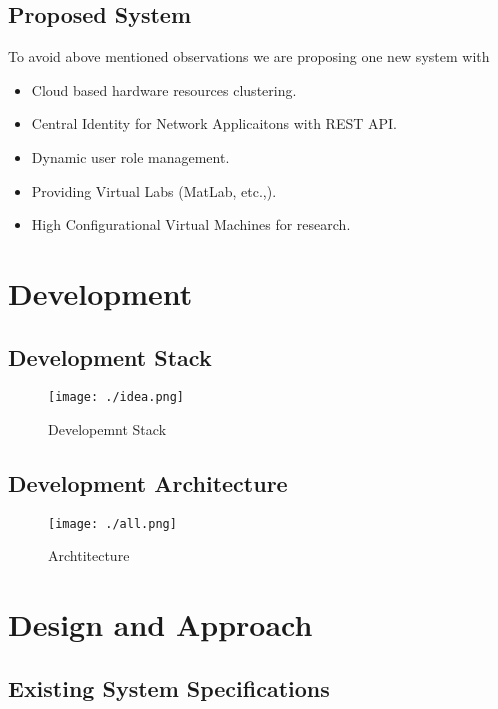 \documentclass[12pt]{report}
\begin{document}
\section{Proposed System}

	To avoid above mentioned observations we are proposing one new system with 
	\begin{itemize}
		\item Cloud based hardware resources clustering.
		\item Central Identity for Network Applicaitons with REST API.
		\item Dynamic user role management.
		\item Providing Virtual Labs (MatLab, etc.,).
		\item High Configurational Virtual Machines for research.
	\end{itemize}

\chapter{Development}

\section{Development Stack}
\begin{figure}[H]
 \centering
 \texttt{[image: ./idea.png]}
 \caption{Developemnt Stack\label{fig:Developemnt Stack}}
\end{figure}

\section{Development Architecture}
\begin{figure}[H]
 \centering
 \texttt{[image: ./all.png]}
 \caption{Archtitecture\label{fig:Archtitecture}}
\end{figure}

\chapter{Design and Approach}

\section{Existing System Specifications}

\end{document}
